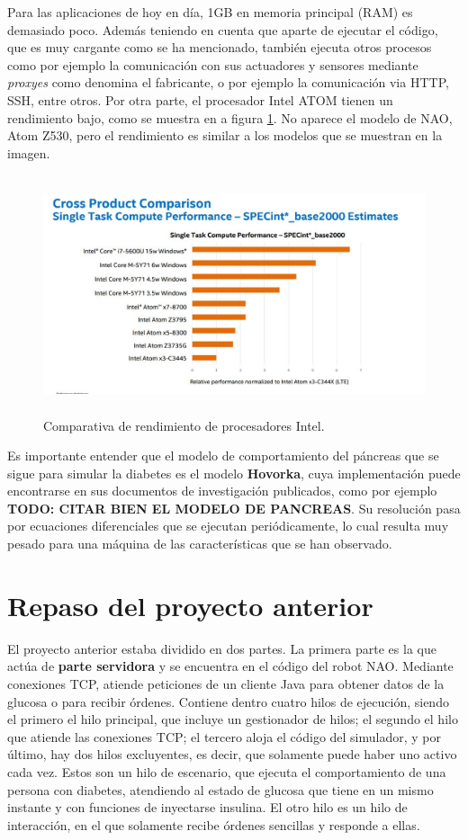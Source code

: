 \documentclass[12pt,spanish,listoffigures,listoftables]{tfgetsinf}
\begin{document}
Para las aplicaciones de hoy en día, 1GB en memoria principal (RAM) es demasiado poco. Además teniendo en cuenta que aparte de ejecutar el código, que es muy cargante como se ha mencionado, también ejecuta otros procesos como por ejemplo la comunicación con sus actuadores y sensores mediante \textit{proxyes} como denomina el fabricante, o por ejemplo la comunicación via HTTP, SSH, entre otros. Por otra parte, el procesador Intel ATOM tienen un rendimiento bajo, como se muestra en a figura \ref{figura:IntelAtom}. No aparece el modelo de NAO, Atom Z530, pero el rendimiento es similar a los modelos que se muestran en la imagen. \\

\begin{figure}[!h]
	\centering
	\includegraphics[height=7cm]{img/IntelAtom}
	\caption{Comparativa de rendimiento de procesadores Intel.}
	\label{figura:IntelAtom}
\end{figure}

Es importante entender que el modelo de comportamiento del páncreas que se sigue para simular la diabetes es el modelo \textbf{Hovorka}, cuya implementación puede encontrarse en sus documentos de investigación publicados, como por ejemplo \textbf{TODO: CITAR BIEN EL MODELO DE PANCREAS}. Su resolución pasa por ecuaciones diferenciales que se ejecutan periódicamente, lo cual resulta muy pesado para una máquina de las características que se han observado.

\section{Repaso del proyecto anterior}

El proyecto anterior estaba dividido en dos partes. La primera parte es la que actúa de \textbf{parte servidora} y se encuentra en el código del robot NAO. Mediante conexiones TCP, atiende peticiones de un cliente Java para obtener datos de la glucosa o para recibir órdenes. Contiene dentro cuatro hilos de ejecución, siendo el primero el hilo principal, que incluye un gestionador de hilos; el segundo el hilo que atiende las conexiones TCP; el tercero aloja el código del simulador, y por último, hay dos hilos excluyentes, es decir, que solamente puede haber uno activo cada vez. Estos son un hilo de escenario, que ejecuta el comportamiento de una persona con diabetes, atendiendo al estado de glucosa que tiene en un mismo instante y con funciones de inyectarse insulina. El otro hilo es un hilo de interacción, en el que solamente recibe órdenes sencillas y responde a ellas. \\
\end{document}
